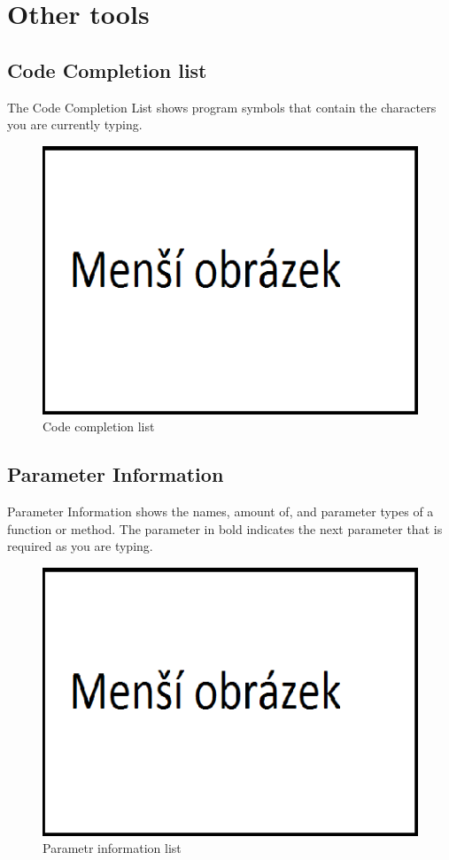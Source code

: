 \section{Other tools}
\subsection{Code Completion list}
The Code Completion List shows program symbols that contain
the characters you are currently typing.
        \begin{figure}
            \centering{}
            \includegraphics [scale=0.3]{img/mensi_obrazek.png}
            \caption{Code completion list}
        \end{figure}

\subsection{Parameter Information}
    Parameter Information shows the names, amount of, and parameter types of a function or method. The
    parameter in bold indicates the next parameter that is required as you are typing.
    \begin{figure}
        \centering{}
        \includegraphics [scale=0.3]{img/mensi_obrazek.png}
        \caption{Parametr information list}
    \end{figure}

